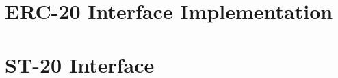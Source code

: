 \renewcommand{\chaptermark}[1]{\markright{\thechapter \ #1}{}}
\lhead[\fancyplain{}{\bfseries\thepage}]{\fancyplain{}{\bfseries\rightmark}}
\appendix                               %
\chapter{ERC-20 Interface Implementation}               %
\label{appendix:ERC-20Interface}




\chapter{ST-20 Interface}               %
\label{appendix:ST20}


